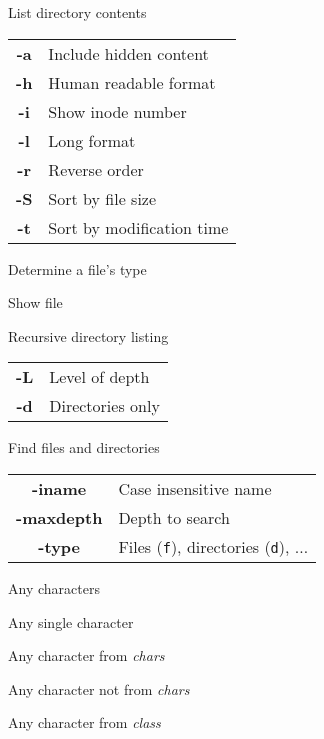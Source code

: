 \documentclass[12pt, a4paper]
{article}
\begin{document}
\begin{multicols}{3}
		\begin{description}[nolistsep]
			\item[ls] List directory contents
			\item
			\begin{tabular}{cl}
				{\large \ttfamily \textbf{-a}} & Include hidden content \\
				{\large \ttfamily \textbf{-h}} & Human readable format\\
				{\large \ttfamily \textbf{-i}} & Show inode number\\
				{\large \ttfamily \textbf{-l}} & Long format \\
				{\large \ttfamily \textbf{-r}} & Reverse order \\
				{\large \ttfamily \textbf{-S}} & Sort by file size \\
				{\large \ttfamily \textbf{-t}} & Sort by modification time\\
			\end{tabular}
			\item[file] Determine a file's type
			\item[less] Show file
			\item[tree] Recursive  directory listing
			\item
			\begin{tabular}{cl}
				{\large \ttfamily \textbf{-L}} & Level of depth \\
				{\large \ttfamily \textbf{-d}} & Directories only\\
			\end{tabular}
			\item[find] Find files and directories
			\item
			\begin{tabular}{cl}
				{\large \ttfamily \textbf{-iname}} & Case insensitive name \\
				{\large \ttfamily \textbf{-maxdepth}} & Depth to search \\
				{\large \ttfamily \textbf{-type}} & Files (\texttt{f}), directories (\texttt{d}), $\dots$ \\
			\end{tabular}
		\end{description}
		
		
		
		\begin{description}[nolistsep]
			\item[*] Any characters
			\item[?] Any single character
			\item[{[\large \textit{chars}}{\Large]}] Any character from \textit{chars}
			\item[{[\large!\textit{chars}}{\Large]}] Any character not from \textit{chars}
			\item[{[\large:\textit{class}:}{\Large]}] Any character from \textit{class}
		\end{description}
		

\end{multicols}
\end{document}
